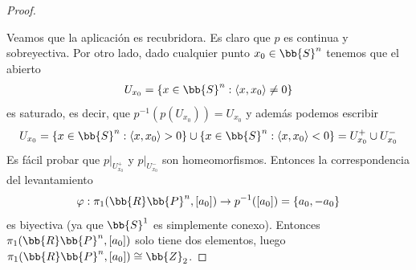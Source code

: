 \begin{coro}
\begin{proof}
\begin{figure}[H]
        \end{figure}

        Veamos que la aplicación
        es recubridora. Es claro que $p$ es continua y sobreyectiva. Por otro lado, dado cualquier punto $x_0\in \bb{S}^n$ tenemos que el abierto
        \begin{gather*}
            U_{x_0} = \{x\in \bb{S}^n : \langle x, x_0 \rangle \neq 0\}
        \end{gather*}
        es saturado, es decir, que $p^{-1}(p(U_{x_0})) = U_{x_0}$ y además podemos escribir
        \begin{gather*}
            U_{x_0} = \{x\in \bb{S}^n : \langle x, x_0 \rangle > 0\} \cup \{x\in \bb{S}^n : \langle x, x_0 \rangle < 0\} = U_{x_0}^+ \cup U_{x_0}^-
        \end{gather*}
        Es fácil probar que $p|_{U_{x_0}^+}$ y $p|_{U_{x_0}^-}$ son homeomorfismos. Entonces la correspondencia del levantamiento
        \begin{gather*}
            \varphi: \pi_1(\bb{R}\bb{P}^n, [a_0]) \to p^{-1}([a_0]) = \{a_0,-a_0\}
        \end{gather*}
        es biyectiva (ya que $\bb{S}^1$ es simplemente conexo). Entonces $\pi_1(\bb{R}\bb{P}^n, [a_0])$ solo tiene dos elementos, luego $\pi_1(\bb{R}\bb{P}^n, [a_0]) \cong \bb{Z}_2$.
    \end{proof}

\end{coro}

